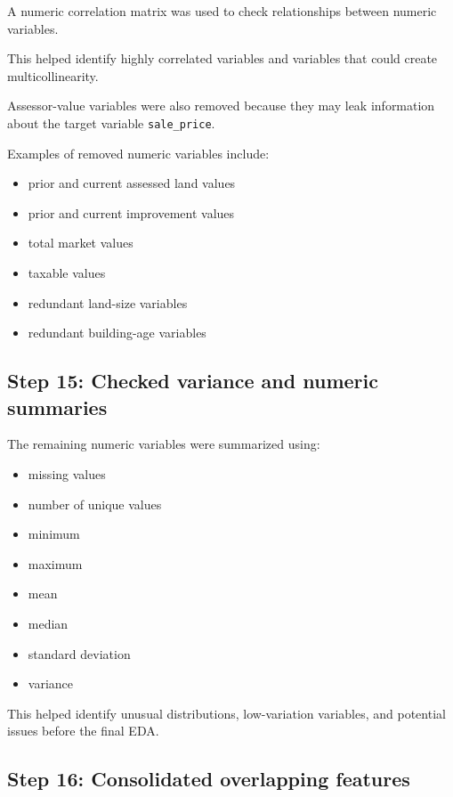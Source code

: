 \documentclass[
  english,
  letterpaper,
  DIV=11,
  numbers=noendperiod]{scrreprt}
\begin{document}
A numeric correlation matrix was used to check relationships between
numeric variables.

This helped identify highly correlated variables and variables that
could create multicollinearity.

Assessor-value variables were also removed because they may leak
information about the target variable \texttt{sale\_price}.

Examples of removed numeric variables include:

\begin{itemize}
\item
  prior and current assessed land values
\item
  prior and current improvement values
\item
  total market values
\item
  taxable values
\item
  redundant land-size variables
\item
  redundant building-age variables
\end{itemize}

\subsection{Step 15: Checked variance and numeric
summaries}\label{step-15-checked-variance-and-numeric-summaries}

The remaining numeric variables were summarized using:

\begin{itemize}
\item
  missing values
\item
  number of unique values
\item
  minimum
\item
  maximum
\item
  mean
\item
  median
\item
  standard deviation
\item
  variance
\end{itemize}

This helped identify unusual distributions, low-variation variables, and
potential issues before the final EDA.

\subsection{Step 16: Consolidated overlapping
features}\label{step-16-consolidated-overlapping-features}
\end{document}

